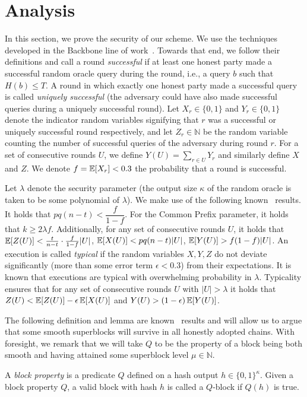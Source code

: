 \section{Analysis}\label{sec:analysis}
In this section, we prove the security of our scheme. We use the techniques
developed in the Backbone line of work~\cite{backbone}. Towards that end, we
follow their definitions and call a round \emph{successful} if at least one
honest party made a successful random oracle query during the round, i.e., a
query $b$ such that $H(b) \leq T$. A round in which exactly one honest party
made a successful query is called \emph{uniquely successful} (the adversary
could have also made successful queries during a uniquely successful round). Let
$X_r \in \{0, 1\}$ and $Y_r \in \{0, 1\}$ denote the indicator random variables
signifying that $r$ was a successful or uniquely successful round respectively,
and let $Z_r \in \mathbb{N}$ be the random variable counting the number of
successful queries of the adversary during round $r$. For a set of consecutive
rounds $U$, we define $Y(U) = \sum_{r \in U} Y_r$ and similarly define $X$ and
$Z$. We denote $f = \operatorname{\mathbb{E}}[X_r] < 0.3$ the probability that a round is successful.

Let $\lambda$ denote the security parameter (the output size $\kappa$ of the
random oracle is taken to be some polynomial of $\lambda$).
We make use of the following known~\cite{backbone} results.
It holds that $pq(n-t) < \dfrac{f}{1-f}$. For the Common Prefix
parameter, it holds that $k \geq 2\lambda f$.
Additionally, for any set of
consecutive rounds $U$, it holds that
$\operatorname{\mathbb{E}}[Z(U)] < \frac{t}{n-t} \cdot \frac{f}{1 - f}|U|$,
$\operatorname{\mathbb{E}}[X(U)] < pq(n - t)|U|$,
$\operatorname{\mathbb{E}}[Y(U)] > f(1 - f)|U|$.
An execution is called \emph{typical}
if the random variables $X, Y, Z$ do not deviate significantly (more than some
error term $\epsilon < 0.3$) from their expectations. It is known that
executions are typical with overwhelming probability in
$\lambda$. Typicality ensures that for any set of consecutive
rounds $U$ with $|U| > \lambda$ it holds that
$Z(U) < \operatorname{\mathbb{E}}[Z(U)] - \epsilon\operatorname{\mathbb{E}}[X(U)]$ and
$Y(U) > (1 - \epsilon)\operatorname{\mathbb{E}}[Y(U)]$.

The following definition and lemma are known~\cite{dionyziz} results and will
allow us to argue that some smooth superblocks will survive in all honestly
adopted chains. With foresight, we remark that we will take $Q$ to be the
property of a block being both smooth and having attained some superblock level
$\mu \in \mathbb{N}$.

\begin{definition}
    A \emph{block property} is a predicate $Q$ defined on a hash output $h \in \{ 0, 1 \}^\kappa$. Given a block property $Q$, a valid block with hash $h$ is called a $Q$-block if $Q(h)$ is true.
\end{definition}

